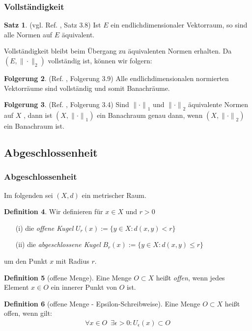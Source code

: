 \documentclass[t, handout]{beamer}
\theoremstyle{definition} %
\newtheorem{sa}{Satz}[section] %
\newtheorem{dfi}[sa]{Definition} %
\newtheorem{fol}[sa]{Folgerung}
\begin{document}
\begin{frame}
\frametitle{Vollständigkeit}
\begin{sa}
(vgl. Ref. \cite{Clason}, Satz 3.8) Ist $E$ ein endlichdimensionaler Vektorraum, so sind alle Normen auf $E$ äquivalent.
\end{sa}
\pause
Vollständigkeit bleibt beim Übergang zu äquivalenten Normen erhalten. \newline Da $(E,\|\cdot\|_2)$ vollständig ist, können wir folgern:
\pause
\begin{fol}
(Ref. \cite{Clason}, Folgerung 3.9) Alle endlichdimensionalen normierten Vektorräume sind vollständig und somit Banachräume.
\end{fol}
\pause
\begin{fol}
(Ref. \cite{Clason}, Folgerung 3.4) Sind ${\|\cdot\|}_1$ und ${\|\cdot\|}_2$ äquivalente Normen auf $X$ , dann ist $(X , {\|\cdot\|}_1)$ ein Banachraum genau dann, wenn $(X , {\|\cdot\|}_2)$ ein Banachraum ist.
\end{fol}
\end{frame}

\subsection{Abgeschlossenheit}

\begin{frame}
\frametitle{Abgeschlossenheit}
Im folgenden sei $(X, d)$ ein metrischer Raum.
\pause
\begin{dfi}
Wir definieren für $x \in X$ und $r >0$
\begin{itemize}
\item[(i)] die \textit{offene Kugel} $U_r (x) := \{y \in X : d(x, y) < r \}$ 
\item[(ii)] die \textit{abgeschlossene Kugel} $B_r (x) := \{y \in X : d(x, y) \leq r \}$ 
\end{itemize}
um den Punkt $x$ mit Radius $r$.
\end{dfi}
\pause
\begin{dfi}[offene Menge]
Eine Menge $O \subset X$ heißt \textit{offen}, wenn jedes Element $x \in O$ ein innerer Punkt von $O$ ist.
\end{dfi}
\pause
\begin{dfi}[offene Menge - Epsilon-Schreibweise]
Eine Menge $O \subset X$ heißt offen, wenn gilt:
\begin{align*}
 \forall x \in O \enspace \exists \epsilon > 0 : U_\epsilon(x) \subset O
\end{align*}
\end{dfi}
\end{frame}
\end{document}
